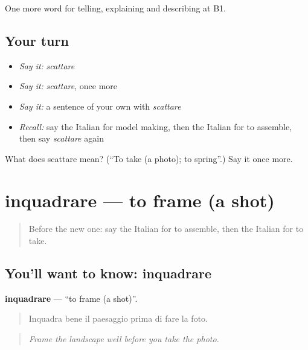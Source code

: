 \begin{grammarlens}[title={What you've built}]
One more word for telling, explaining and describing at B1.
\end{grammarlens}

\subsection*{Your turn}
\begin{itemize}
\raggedright
  \item \emph{Say it:} \emph{scattare}
  \item \emph{Say it:} \emph{scattare}, once more
  \item \emph{Say it:} a sentence of your own with \emph{scattare}
  \item \emph{Recall:} say the Italian for model making, then the Italian for to assemble, then say \emph{scattare} again
\end{itemize}

\begin{tcolorbox}[breakable,colback=teal!4,colframe=teal!35!black,title={Before you move on}]
What does scattare mean? (\textquotedblleft{}To take (a photo); to spring\textquotedblright{}.) Say it once more.
\end{tcolorbox}
\section[inquadrare]{inquadrare — to frame (a shot)}

\label{lesson:IT-C506-inquadrare}



\begin{quote}
Before the new one: say the Italian for to assemble, then the Italian for to take.
\end{quote}

\subsection*{You'll want to know: inquadrare}
\textbf{inquadrare} — \textquotedblleft{}to frame (a shot)\textquotedblright{}.

\begin{quote}
Inquadra bene il paesaggio prima di fare la foto.
\end{quote}

\begin{quote}
\emph{Frame the landscape well before you take the photo.}
\end{quote}

